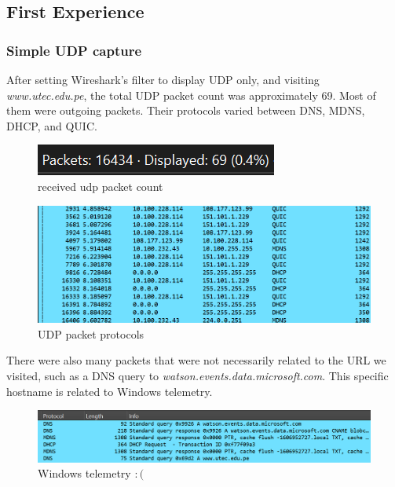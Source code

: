\subsection{First Experience}

\subsubsection{Simple UDP capture}

After setting Wireshark's filter to display UDP only, and visiting
\textit{www.utec.edu.pe}, the total UDP packet count was approximately 69. Most
of them were outgoing packets. Their protocols varied between DNS, MDNS, DHCP,
and QUIC.\@

\begin{figure}[htbp]
	\centering
	\includegraphics[width=1\linewidth]{img/1.png}
	\caption{received udp packet count}\label{fig:1}
\end{figure}

\begin{figure}[htbp]
	\centering
	\includegraphics[width=1\linewidth]{img/2.png}
	\caption{UDP packet protocols}\label{fig:2}
\end{figure}

There were also many packets that were not necessarily related to the URL we
visited, such as a DNS query to \textit{watson.events.data.microsoft.com}. This
specific hostname is related to Windows telemetry.

\begin{figure}[htbp]
	\centering
	\includegraphics[width=1\linewidth]{img/3.png}
	\caption{Windows telemetry \(:(\)}\label{fig:3}
\end{figure}

